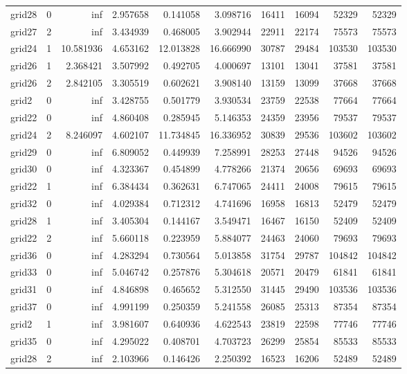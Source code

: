 \begin{longtable}{|l|r|r|r|r|r|r|r|r|r|}
grid28 & 0 & inf & 2.957658 & 0.141058 & 3.098716 & 16411 & 16094 & 52329 & 52329 \\
grid27 & 2 & inf & 3.434939 & 0.468005 & 3.902944 & 22911 & 22174 & 75573 & 75573 \\
grid24 & 1 & 10.581936 & 4.653162 & 12.013828 & 16.666990 & 30787 & 29484 & 103530 & 103530 \\
grid26 & 1 & 2.368421 & 3.507992 & 0.492705 & 4.000697 & 13101 & 13041 & 37581 & 37581 \\
grid26 & 2 & 2.842105 & 3.305519 & 0.602621 & 3.908140 & 13159 & 13099 & 37668 & 37668 \\
grid2 & 0 & inf & 3.428755 & 0.501779 & 3.930534 & 23759 & 22538 & 77664 & 77664 \\
grid22 & 0 & inf & 4.860408 & 0.285945 & 5.146353 & 24359 & 23956 & 79537 & 79537 \\
grid24 & 2 & 8.246097 & 4.602107 & 11.734845 & 16.336952 & 30839 & 29536 & 103602 & 103602 \\
grid29 & 0 & inf & 6.809052 & 0.449939 & 7.258991 & 28253 & 27448 & 94526 & 94526 \\
grid30 & 0 & inf & 4.323367 & 0.454899 & 4.778266 & 21374 & 20656 & 69693 & 69693 \\
grid22 & 1 & inf & 6.384434 & 0.362631 & 6.747065 & 24411 & 24008 & 79615 & 79615 \\
grid32 & 0 & inf & 4.029384 & 0.712312 & 4.741696 & 16958 & 16813 & 52479 & 52479 \\
grid28 & 1 & inf & 3.405304 & 0.144167 & 3.549471 & 16467 & 16150 & 52409 & 52409 \\
grid22 & 2 & inf & 5.660118 & 0.223959 & 5.884077 & 24463 & 24060 & 79693 & 79693 \\
grid36 & 0 & inf & 4.283294 & 0.730564 & 5.013858 & 31754 & 29787 & 104842 & 104842 \\
grid33 & 0 & inf & 5.046742 & 0.257876 & 5.304618 & 20571 & 20479 & 61841 & 61841 \\
grid31 & 0 & inf & 4.846898 & 0.465652 & 5.312550 & 31445 & 29490 & 103536 & 103536 \\
grid37 & 0 & inf & 4.991199 & 0.250359 & 5.241558 & 26085 & 25313 & 87354 & 87354 \\
grid2 & 1 & inf & 3.981607 & 0.640936 & 4.622543 & 23819 & 22598 & 77746 & 77746 \\
grid35 & 0 & inf & 4.295022 & 0.408701 & 4.703723 & 26299 & 25854 & 85533 & 85533 \\
grid28 & 2 & inf & 2.103966 & 0.146426 & 2.250392 & 16523 & 16206 & 52489 & 52489 \\

\end{longtable}
